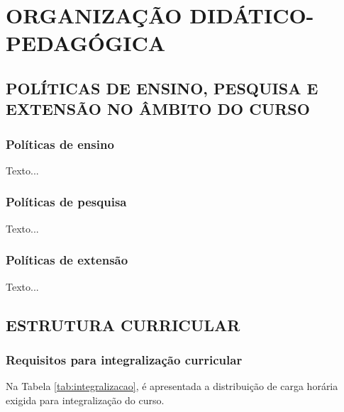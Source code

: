 
\chapter{ORGANIZAÇÃO DIDÁTICO-PEDAGÓGICA}

\section{POLÍTICAS DE ENSINO, PESQUISA E EXTENSÃO NO ÂMBITO DO CURSO}
\subsection{Políticas de ensino}
Texto...
\subsection{Políticas de pesquisa}
Texto...
\subsection{Políticas de extensão}
Texto...

\section{ESTRUTURA CURRICULAR}

\subsection{Requisitos para integralização curricular}
Na Tabela \ref{tab:integralizacao}, é apresentada a distribuição de carga horária exigida para integralização do curso.

